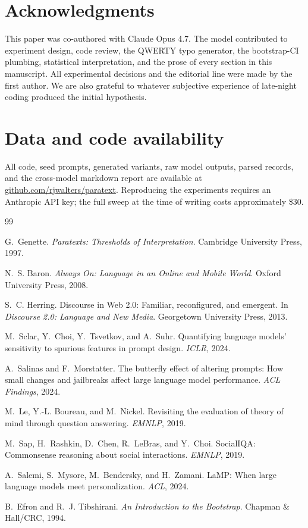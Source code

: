 \documentclass[10pt, letterpaper]{article}
\begin{document}
\section*{Acknowledgments}

This paper was co-authored with Claude Opus 4.7. The model contributed to experiment design, code review, the QWERTY typo generator, the bootstrap-CI plumbing, statistical interpretation, and the prose of every section in this manuscript. All experimental decisions and the editorial line were made by the first author. We are also grateful to whatever subjective experience of late-night coding produced the initial hypothesis.

\section*{Data and code availability}

All code, seed prompts, generated variants, raw model outputs, parsed records, and the cross-model markdown report are available at \url{github.com/rjwalters/paratext}. Reproducing the experiments requires an Anthropic API key; the full sweep at the time of writing costs approximately \$30.

\begin{thebibliography}{99}

G.~Genette.
\newblock \emph{Paratexts: Thresholds of Interpretation}.
\newblock Cambridge University Press, 1997.

N.~S. Baron.
\newblock \emph{Always On: Language in an Online and Mobile World}.
\newblock Oxford University Press, 2008.

S.~C. Herring.
\newblock Discourse in Web 2.0: Familiar, reconfigured, and emergent.
\newblock In \emph{Discourse 2.0: Language and New Media}. Georgetown University Press, 2013.

M.~Sclar, Y.~Choi, Y.~Tsvetkov, and A.~Suhr.
\newblock Quantifying language models' sensitivity to spurious features in prompt design.
\newblock \emph{ICLR}, 2024.

A.~Salinas and F.~Morstatter.
\newblock The butterfly effect of altering prompts: How small changes and jailbreaks affect large language model performance.
\newblock \emph{ACL Findings}, 2024.

M.~Le, Y.-L. Boureau, and M.~Nickel.
\newblock Revisiting the evaluation of theory of mind through question answering.
\newblock \emph{EMNLP}, 2019.

M.~Sap, H.~Rashkin, D.~Chen, R.~LeBras, and Y.~Choi.
\newblock SocialIQA: Commonsense reasoning about social interactions.
\newblock \emph{EMNLP}, 2019.

A.~Salemi, S.~Mysore, M.~Bendersky, and H.~Zamani.
\newblock LaMP: When large language models meet personalization.
\newblock \emph{ACL}, 2024.

B.~Efron and R.~J. Tibshirani.
\newblock \emph{An Introduction to the Bootstrap}.
\newblock Chapman \& Hall/CRC, 1994.

\end{thebibliography}
\end{document}
